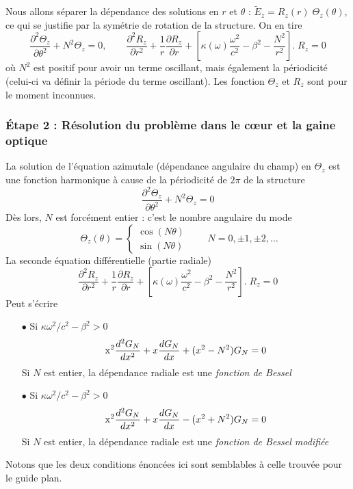 Nous allons séparer la dépendance des solutions en $r$ et $\theta$ : ${\tilde E_z} = {R_z}(r)\;{\Theta
_z}(\theta )$, ce qui se justifie par la symétrie de rotation de la structure. On en tire
\begin{equation}
\frac{{{\partial ^2}{\Theta _z}}}{{\partial {\theta ^2}}} + {N^2}{\Theta _z} = 0,\qquad
\frac{{{\partial ^2}{R_z}}}{{\partial {r^2}}} + \frac{1}{r}\frac{{\partial {R_z}}}{{\partial r}} + [\kappa (\omega )\frac{{{\omega ^2}}}{{{c^2}}} - {\beta ^2} - \frac{{{N^2}}}{{{r^2}}}].\;{R_z} = 0
\end{equation}
où $N^2$ est positif pour avoir un terme oscillant, mais également la périodicité (celui-ci va 
définir la période du terme oscillant). Les fonction $\Theta_z$ et $R_z$ sont pour le moment 
inconnues.

\subsubsection{Étape 2 : Résolution du problème dans le cœur et la gaine optique}
La solution de l'équation azimutale (dépendance angulaire du champ) en $\Theta_z$ est une 
fonction harmonique à cause de la périodicité de $2\pi$ de la structure
\begin{equation}
\frac{{{\partial ^2}{\Theta _z}}}{{\partial {\theta ^2}}} + {N^2}{\Theta _z} = 0
\end{equation}
Dès lors, $N$ est forcément entier : c'est le nombre angulaire du mode
\begin{equation}
\;{\Theta _z}(\theta ) = \left\{ {\begin{array}{*{20}{c}}
{\cos (N\theta )}\\
{\sin (N\theta )}
\end{array}} \right.\qquad N= 0, \pm 1, \pm 2, \dots
\end{equation}
La seconde équation différentielle (partie radiale)
\begin{equation}
\frac{{{\partial ^2}{R_z}}}{{\partial {r^2}}} + \frac{1}{r}\frac{{\partial {R_z}}}{{\partial r}} + [\kappa (\omega )\frac{{{\omega ^2}}}{{{c^2}}} - {\beta ^2} - \frac{{{N^2}}}{{{r^2}}}].\;{R_z} = 0
\end{equation}
Peut s'écrire
\begin{itemize}
\item[$\bullet$] Si $\kappa\omega^2/c^2 - \beta^2 > 0$
\begin{equation}
{{\rm{x}}^2}\frac{{{d^2}{G_N}}}{{d{x^2}}} + x\frac{{d{G_N}}}{{dx}} + ({x^2} - {N^2}){G_N} = 0
\end{equation}
Si $N$ est entier, la dépendance radiale est une \textit{fonction de Bessel}
\item[$\bullet$] Si $\kappa\omega^2/c^2 - \beta^2 > 0$
\begin{equation}
{{\rm{x}}^2}\frac{{{d^2}{G_N}}}{{d{x^2}}} + x\frac{{d{G_N}}}{{dx}} - ({x^2} + {N^2}){G_N} = 0
\end{equation}
Si $N$ est entier, la dépendance radiale est une \textit{fonction de Bessel modifiée}
\end{itemize}
Notons que les deux conditions énoncées ici sont semblables à celle trouvée pour le guide plan.

